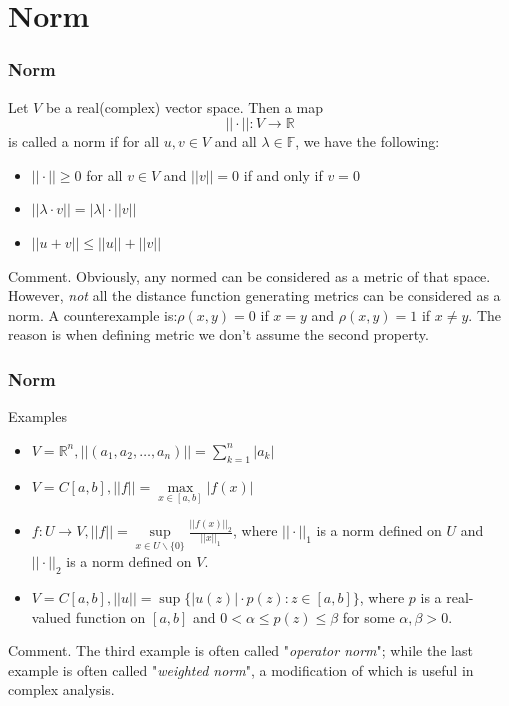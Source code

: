 \documentclass{beamer}
\begin{document}
\section{Norm}
\begin{frame}
    \frametitle{Norm}
\hspace{1em} 
Let $V$ be a real(complex) vector space. Then a map 
\begin{equation*}
    ||\cdot||:V\rightarrow \mathbb{R}
\end{equation*}
is called a norm if for all $u,v\in V$ and all $\lambda\in\mathbb{F}$, we have the following:
\begin{itemize}
    \item $||\cdot||\geq 0$ for all $v\in V$ and $||v||=0$ if and only if $v=0$
    \item $||\lambda\cdot v||=|\lambda|\cdot ||v||$
    \item $||u+v||\leq ||u||+||v||$
\end{itemize}
\vspace{1em}
Comment.  Obviously, any normed can be considered as a metric of that space. However, \emph{not} all the distance function generating metrics can be 
considered as a norm. A counterexample is:$\rho(x,y)=0$ if $x=y$ and $\rho(x,y)=1$ if $x\neq y$. The reason is when defining metric we don't assume 
the second property.
    
\end{frame}
\begin{frame}
    \frametitle{Norm}
Examples\\

\begin{itemize}
    \item $V=\mathbb{R}^n, ||(a_1,a_2,\dots,a_n)||=\sum^{n}_{k=1}|a_k|$
    \item $V=C[a,b], ||f||=\underset{x\in[a,b]}{\max}|f(x)|$
    \item $f:U\rightarrow V, ||f||=\underset{x\in U\backslash\{0\}}{\sup}\frac{||f(x)||_2}{||x||_1}$, where $||\cdot||_1$ is a norm defined on $U$ and $||\cdot||_2$ is a norm defined on $V$.
    \item $V=C[a,b], ||u||=\sup\{|u(z)|\cdot p(z):z\in[a,b]\}$, where $p$ is a real-valued function on $[a,b]$ and $0<\alpha\leq p(z)\leq \beta $ for some $\alpha,\beta>0$.
\end{itemize}

\vspace{1em}
Comment. The third example is often called "\emph{operator norm}"; while the last example is often called "\emph{weighted norm}", a modification of which is useful in complex analysis.
    
\end{frame}
\end{document}
